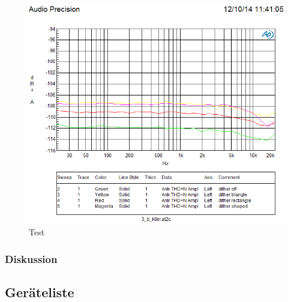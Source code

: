 \begin{figure}[h!]
\centering
\includegraphics[width=\columnwidth]{figures/Aufg2/3b1.PNG} 
\caption{Test}
\end{figure}
\clearpage
\subsubsection{Diskussion}


\subsection{Geräteliste}


